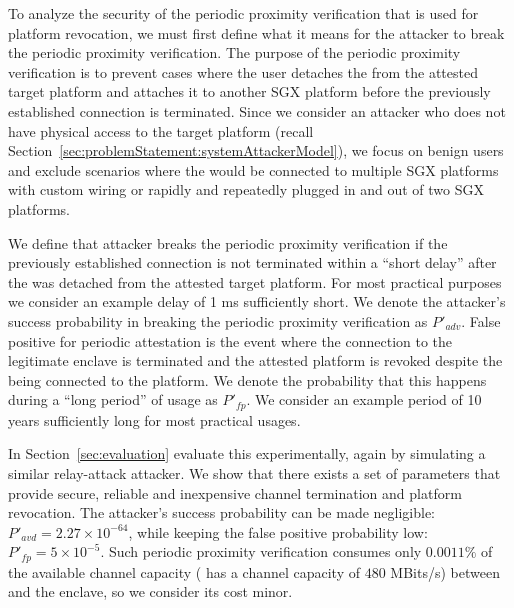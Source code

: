 To analyze the security of the periodic proximity verification that is used for platform revocation, we must first define what it means for the attacker to break the periodic proximity verification. The purpose of the periodic proximity verification is to prevent cases where the user detaches the \device from the attested target platform and attaches it to another SGX platform before the previously established connection is terminated. Since we consider an attacker who does not have physical access to the target platform (recall Section~\ref{sec:problemStatement:systemAttackerModel}), we focus on benign users and exclude scenarios where the \device would be connected to multiple SGX platforms with custom wiring or rapidly and repeatedly plugged in and out of two SGX platforms.


We define that attacker breaks the periodic proximity verification if the previously established connection is not terminated within a ``short delay'' after the \device was detached from the attested target platform. For most practical purposes we consider an example delay of 1 ms sufficiently short. We denote the attacker's success probability in breaking the periodic proximity verification as $P'_{adv}$.
%
False positive for periodic attestation is the event where the connection to the legitimate enclave is terminated and the attested platform is revoked despite the \device being connected to the platform. We denote the probability that this happens during a ``long period'' of usage as $P'_{fp}$. We consider an example period of 10 years sufficiently long for most practical usages.

In Section~\ref{sec:evaluation} evaluate this experimentally, again by simulating a similar relay-attack attacker. We show that there exists a set of parameters that provide secure, reliable and inexpensive channel termination and platform revocation. %
The attacker's success probability can be made negligible: $P'_{avd}=2.27\times10^{-64}$, while keeping the false positive probability low: $P'_{fp}=5\times10^{-5}$. Such periodic proximity verification consumes only $0.0011\%$ of the available channel capacity ( has a channel capacity of $480$ MBits/s) between \device and the enclave, so we consider its cost minor.

